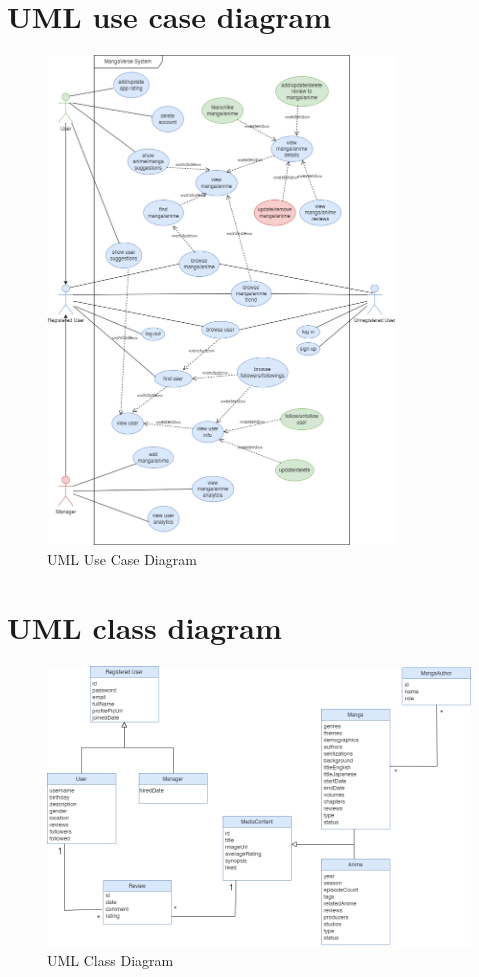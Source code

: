 \section{UML use case diagram}
\begin{figure}[h]
    \centering
    \includegraphics[width=0.82\textwidth]{Media/useCase.png}
    \caption{UML Use Case Diagram}
    \label{uml use case diagram}
\end{figure}

\newpage

\section{UML class diagram}
\begin{figure}[h]
    \centering
    \includegraphics[width=\linewidth]{Media/Class Diagram.png}
    \caption{UML Class Diagram}
    \label{uml class diagram}
\end{figure}

